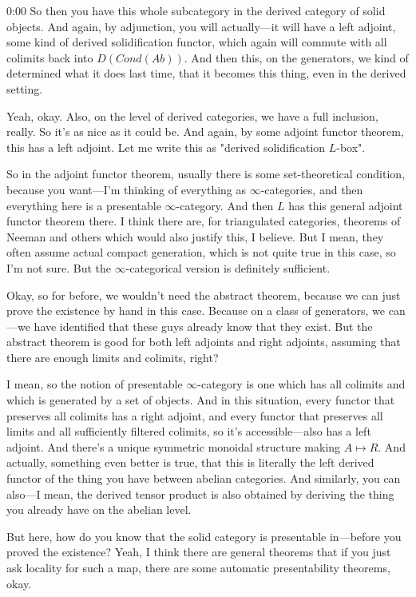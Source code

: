 \begin{unfinished}{0:00}
So then you have this whole subcategory in the derived category of solid objects. And again, by adjunction, you will actually---it will have a left adjoint, some kind of derived solidification functor, which again will commute with all colimits back into $D(Cond(Ab))$. And then this, on the generators, we kind of determined what it does last time, that it becomes this thing, even in the derived setting.

Yeah, okay. Also, on the level of derived categories, we have a full inclusion, really. So it's as nice as it could be. And again, by some adjoint functor theorem, this has a left adjoint. Let me write this as "derived solidification $L$-box".

So in the adjoint functor theorem, usually there is some set-theoretical condition, because you want---I'm thinking of everything as $\infty$-categories, and then everything here is a presentable $\infty$-category. And then $L$ has this general adjoint functor theorem there. I think there are, for triangulated categories, theorems of Neeman and others which would also justify this, I believe. But I mean, they often assume actual compact generation, which is not quite true in this case, so I'm not sure. But the $\infty$-categorical version is definitely sufficient.

Okay, so for before, we wouldn't need the abstract theorem, because we can just prove the existence by hand in this case. Because on a class of generators, we can---we have identified that these guys already know that they exist. But the abstract theorem is good for both left adjoints and right adjoints, assuming that there are enough limits and colimits, right?

I mean, so the notion of presentable $\infty$-category is one which has all colimits and which is generated by a set of objects. And in this situation, every functor that preserves all colimits has a right adjoint, and every functor that preserves all limits and all sufficiently filtered colimits, so it's accessible---also has a left adjoint. And there's a unique symmetric monoidal structure making $A \mapsto R$. And actually, something even better is true, that this is literally the left derived functor of the thing you have between abelian categories. And similarly, you can also---I mean, the derived tensor product is also obtained by deriving the thing you already have on the abelian level.

But here, how do you know that the solid category is presentable in---before you proved the existence? Yeah, I think there are general theorems that if you just ask locality for such a map, there are some automatic presentability theorems, okay.


\end{unfinished}
